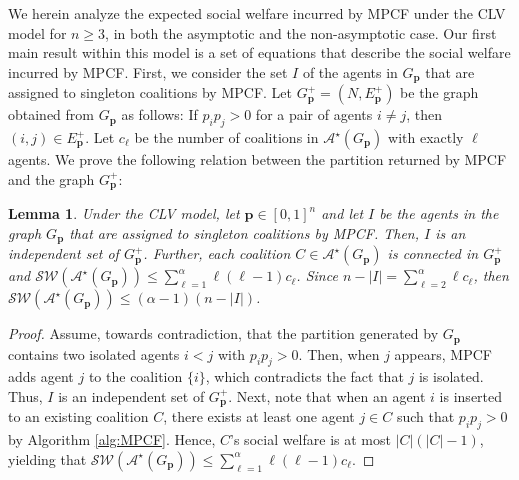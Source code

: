\documentclass[letterpaper]{article} %
\newtheorem{lemma}{Lemma}
\begin{document}
We herein analyze the expected social welfare incurred by MPCF under the CLV model for $n \geq 3$, in both the asymptotic and the non-asymptotic case. %
%
Our first main result within this model is a set of equations that describe the social welfare incurred by MPCF. First, we consider the set $I$ of the agents in $G_{\mathbf{p}}$ that are assigned to singleton coalitions by MPCF. Let $G^+_{\mathbf{p}} = (N, E_{\mathbf{p}}^+)$ be the graph obtained from $G_{\mathbf{p}}$ as follows: If $p_i p_j > 0$ for a pair of agents $i\neq j$, then $(i,j) \in E_{\mathbf{p}}^+$. Let $c_\ell$ be the number of coalitions in $\mathcal{A}^\star(G_\mathbf{p})$ with exactly $\ell$ agents. We prove the following relation between the partition returned by MPCF and the graph $G^+_{\mathbf{p}}$:
\begin{lemma}
    \label{lemma:isolated}
    Under the CLV model, let $\mathbf{p} \in [0,1]^n$ and let $I$ be the agents in the graph $G_{\mathbf{p}}$ that are assigned to singleton coalitions by MPCF. Then, $I$ is an independent set of $G^+_{\mathbf{p}}$. Further, each coalition $C \in \mathcal{A}^\star(G_\mathbf{p})$ is connected in $G^+_{\mathbf{p}}$ and $\mathcal{SW}(\mathcal{A}^\star(G_\mathbf{p})) \leq \sum_{\ell=1}^\alpha \ell(\ell-1) c_\ell$. Since $n - |I| = \sum_{\ell=2}^\alpha \ell c_\ell$, then $\mathcal{SW}(\mathcal{A}^\star(G_\mathbf{p})) \leq (\alpha-1) (n-|I|)$. 
\end{lemma}
\begin{proof}
    Assume, towards contradiction, that the partition generated by $G_{\mathbf{p}}$ contains two isolated agents $i<j$ with $p_i p_j > 0$. Then, when $j$ appears, MPCF adds agent $j$ to the coalition $\{i\}$, which contradicts the fact that $j$ is isolated. Thus, $I$ is an independent set of $G^+_{\mathbf{p}}$. Next, note that when an agent $i$ is inserted to an existing coalition $C$, there exists at least one agent $j \in C$ such that $p_i p_j > 0$ by Algorithm \ref{alg:MPCF}. Hence, $C$'s social welfare is at most $|C|(|C|-1)$, yielding that $\mathcal{SW}(\mathcal{A}^\star(G_\mathbf{p})) \leq \sum_{\ell=1}^\alpha \ell(\ell-1) c_\ell$.
\end{proof}
\end{document}
